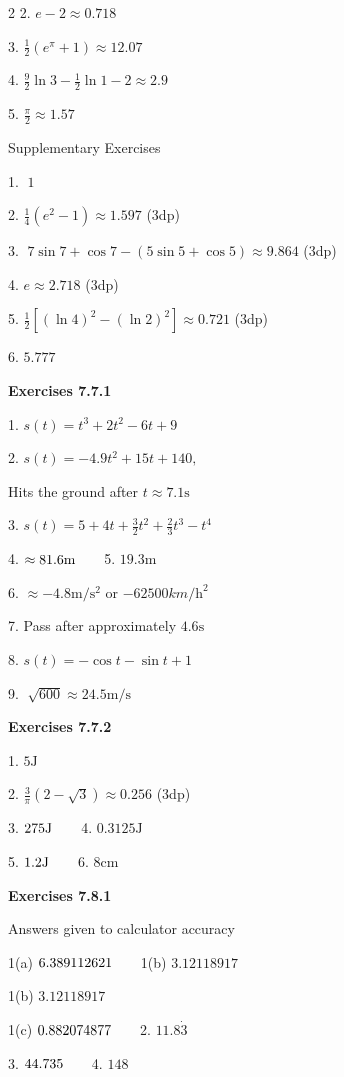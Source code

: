 \begin {multicols}{2}
2. $e -2 \approx 0.718$ 

3. $\frac{1}{2} \left (e^{\pi } +1\right ) \approx 12.07$ 

4. $\frac{9}{2} \ln  3 -\frac{1}{2} \ln  1 -2 \approx 2.9$ 

5. $\frac{\pi }{2} \approx 1.57$ 

Supplementary Exercises 

1. $\;1$ 

2. $\frac{1}{4} \left (e^{2} -1\right ) \approx 1.597$ (3dp) 

3. $\;7 \sin  7 +\cos  7 -\left (5 \sin  5 +\cos  5\right ) \approx 9.864$ (3dp) 

4. $e \approx 2.718$ (3dp) 

5. $\frac{1}{2} \left [\left (\ln  4\right )^{2} -\left (\ln  2\right )^{2}\right ] \approx 0.721$ (3dp) 

6. $5.777$ 

\textbf{Exercises 7.7.1} 

1. $s (t) =t^{3} +2 t^{2} -6 t +9$ 

2. $s (t) = -4.9 t^{2} +15 t +140\text{,}$ 

Hits the ground after $t \approx 7.1 \mbox{s}$ 

3. $s (t) =5 +4 t +\frac{3}{2} t^{2} +\frac{2}{3} t^{3} -t^{4}$ 

4. $ \approx 81.6 \mbox{m}\text{\quad \quad }$5. $19.3 \mbox{m}$ 

6. $ \approx  -4.8 \mathrm{m}/\mathrm{s}^{2}$ or $ -62500 km/\mathrm{h}^{2}$ 

7. Pass after approximately $4.6 \mbox{s}$ 

8. $s (t) = -\cos  t -\sin  t +1$ 

9. $\;\sqrt{600} \approx 24.5 \mathrm{m}/\mbox{s}$ 

\textbf{Exercises 7.7.2} 

1. $5 \mbox{J}$ 

2. $\frac{3}{\pi } \left (2 -\sqrt{3}\right ) \approx 0.256$ (3dp) 

3. $275 \mbox{J}\text{\quad \quad }$4. $0.3125 \mbox{J}$ 

5. $1.2 \mbox{J}\text{\quad \quad }$6. $8 \mbox{cm}$ 

\textbf{Exercises 7.8.1} 

Answers given to calculator
accuracy 

1(a) $6.389112621\text{\quad \quad }$1(b) $3.12118917$ 

1(b) $3.12118917$ 

1(c) $0.882074877\text{\quad \quad }$2. $11.8 \dot{3}$ 

3. $44.735\text{\quad \quad }$4. $148$ 


\end {multicols}

